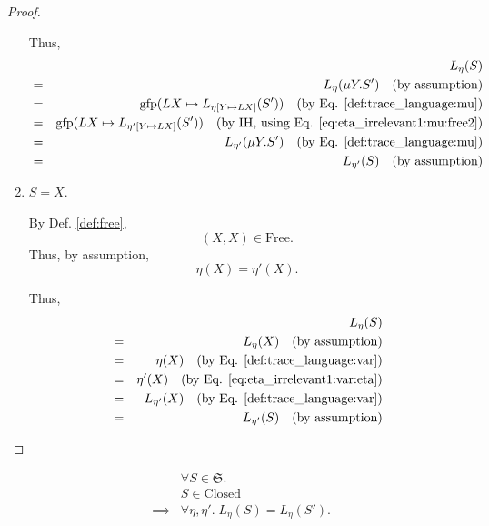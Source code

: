 \documentclass{llncs}
\renewcommand*{\S}{\mathfrak{S}}
\newcommand*{\gfp}{\mathrm{gfp}}
\newcommand*{\Free}{\mathrm{Free}}
\newcommand*{\Closed}{\mathrm{Closed}}
\renewcommand*{\|}{\;|\;}
\begin{document}
\begin{proof}
\begin{enumerate}
      Thus,
      \begin{eqnarray*}
        &&  L_\eta(S) \\
        &=& L_\eta(\mu Y.S')
        \quad \text{(by assumption)} \\
        &=& \gfp(LX \mapsto L_{\eta[Y \mapsto LX]}(S'))
        \quad \text{(by Eq. \ref{def:trace_language:mu})} \\
        &=& \gfp(LX \mapsto L_{\eta'[Y \mapsto LX]}(S'))
        \quad \text{(by IH, using Eq. \ref{eq:eta_irrelevant1:mu:free2})} \\
        &=& L_{\eta'}(\mu Y.S')
        \quad \text{(by Eq. \ref{def:trace_language:mu})} \\
        &=&  L_{\eta'}(S)
        \quad \text{(by assumption)}
      \end{eqnarray*}

    \item
      \label{case:eta_irrelevant1:var}
      $S = X$.

      By Def. \ref{def:free},
      \begin{equation}
        (X, X) \in \Free.
      \end{equation}
      Thus, by assumption,
      \begin{equation}
        \label{eq:eta_irrelevant1:var:eta}
        \eta(X) = \eta'(X).
      \end{equation}

      Thus,
      \begin{eqnarray*}
        && L_\eta(S) \\
        &=& L_\eta(X)
        \quad \text{(by assumption)} \\
        &=& \eta(X)
        \quad \text{(by Eq. \ref{def:trace_language:var})} \\
        &=& \eta'(X)
        \quad \text{(by Eq. \ref{eq:eta_irrelevant1:var:eta})} \\
        &=& L_{\eta'}(X)
        \quad \text{(by Eq. \ref{def:trace_language:var})} \\
        &=& L_{\eta'}(S)
        \quad \text{(by assumption)}
      \end{eqnarray*}

  \end{enumerate}
\end{proof}


\begin{lemma}
  \label{lemma:eta_irrelevant2}
  \begin{eqnarray*}
    &&         \forall S \in \S. \\
    &&         S \in \Closed \\
    &\implies& \forall \eta, \eta'.\; L_\eta(S) = L_\eta(S').
  \end{eqnarray*}
\end{lemma}
\end{document}
